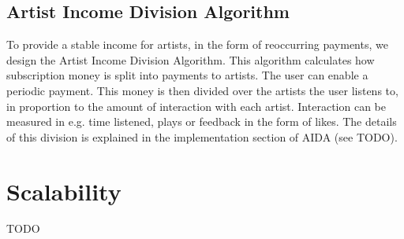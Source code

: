 \subsection{Artist Income Division Algorithm}
\label{sec:aida-design}
To provide a stable income for artists, in the form of reoccurring payments, we design the Artist Income Division Algorithm. This algorithm calculates how subscription money is split into payments to artists. The user can enable a periodic payment. This money is then divided over the artists the user listens to, in proportion to the amount of interaction with each artist. Interaction can be measured in e.g. time listened, plays or feedback in the form of likes. The details of this division is explained in the implementation section of AIDA (see TODO).



\section{Scalability}
TODO
